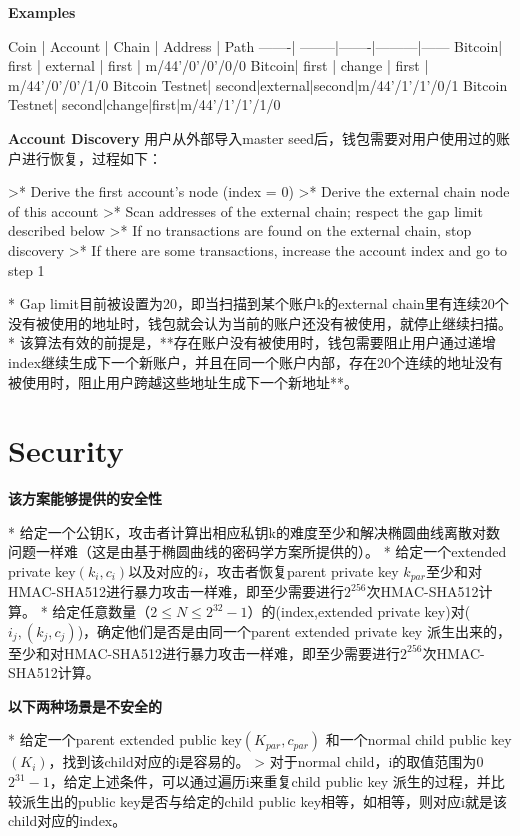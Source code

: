 \documentclass{article}
\begin{document}
\textbf{Examples}

Coin   | Account | Chain | Address | Path 
-------| --------|-------|---------|------
Bitcoin| first   | external | first | m/44'/0'/0'/0/0 
Bitcoin| first   | change | first | m/44'/0'/0'/1/0 
Bitcoin Testnet| second|external|second|m/44'/1'/1'/0/1
Bitcoin Testnet| second|change|first|m/44'/1'/1'/1/0

\textbf{Account Discovery}
用户从外部导入master seed后，钱包需要对用户使用过的账户进行恢复，过程如下：

>* Derive the first account's node (index = 0)
>* Derive the external chain node of this account
>* Scan addresses of the external chain; respect the gap limit described below
>* If no transactions are found on the external chain, stop discovery
>* If there are some transactions, increase the account index and go to step 1

* Gap limit目前被设置为20，即当扫描到某个账户k的external chain里有连续20个没有被使用的地址时，钱包就会认为当前的账户还没有被使用，就停止继续扫描。
* 该算法有效的前提是，**存在账户没有被使用时，钱包需要阻止用户通过递增index继续生成下一个新账户，并且在同一个账户内部，存在20个连续的地址没有被使用时，阻止用户跨越这些地址生成下一个新地址**。


\section{ Security}
\textbf{该方案能够提供的安全性}

* 给定一个公钥K，攻击者计算出相应私钥k的难度至少和解决椭圆曲线离散对数问题一样难（这是由基于椭圆曲线的密码学方案所提供的）。
* 给定一个extended private key$(k_i,c_i)$以及对应的$i$，攻击者恢复parent private key $k_{par}$至少和对HMAC-SHA512进行暴力攻击一样难，即至少需要进行$2^{256}$次HMAC-SHA512计算。
* 给定任意数量（$2\leq N\leq 2^{32}-1$）的(index,extended private key)对($i_j,(k_j,c_j)$)，确定他们是否是由同一个parent extended private key 派生出来的，至少和对HMAC-SHA512进行暴力攻击一样难，即至少需要进行$2^{256}$次HMAC-SHA512计算。

\textbf{以下两种场景是不安全的}

* 给定一个parent extended public key$(K_{par},c_{par})$ 和一个normal child public key $(K_i)$，找到该child对应的i是容易的。
> 对于normal child，i的取值范围为$0$~$2^{31}-1$，给定上述条件，可以通过遍历i来重复child public key 派生的过程，并比较派生出的public key是否与给定的child public key相等，如相等，则对应i就是该child对应的index。
\end{document}
